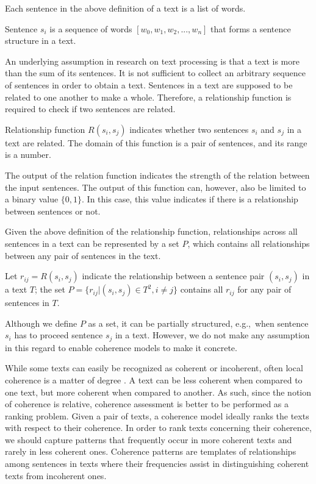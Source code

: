 Each sentence in the above definition of a text is a list of words.

\begin{definition}
Sentence $s_i$ is a sequence of words $[w_0, w_1, w_2, ... , w_n]$ that forms a sentence structure in a text. 
\end{definition}

An underlying assumption in research on text processing is that a text is more than the sum of its sentences. 
It is not sufficient to collect an arbitrary sequence of sentences in order to obtain a text. 
Sentences in a text are supposed to be related to one another to make a whole. 
Therefore, a relationship function is required to check if two sentences are related. 

\begin{definition}
Relationship function $R(s_i,s_j)$ indicates whether two sentences $s_i$ and $s_j$ in a text are related. 
The domain of this function is a pair of sentences, and its range is a number. 
\end{definition} 

The output of the relation function indicates the strength of the relation between the input sentences.  
The output of this function can, however, also be limited to a binary value $\lbrace 0,1\rbrace$. 
In this case, this value indicates if there is a relationship between sentences or not. 

Given the above definition of the relationship function, relationships across all sentences in a text can be represented by a set $P$, which contains all relationships between any pair of sentences in the text. 

\begin{definition}
Let $r_{ij}= R(s_i,s_j)$ indicate the relationship between a sentence pair $(s_i,s_j)$ in a text $T$; the set $P = \lbrace r_{ij}| (s_i,s_j) \in T^2, i \neq j \rbrace$ contains all $r_{ij}$ for any pair of sentences in $T$.
\end{definition}  

Although we define $P$ as a set, it can be partially structured, e.g.,\ when sentence $s_i$ has to proceed sentence $s_j$ in a text. 
However, we do not make any assumption in this regard to enable coherence models to make it concrete. 

While some texts can easily be recognized as coherent or incoherent, often local coherence is a matter of degree \cite{halliday76}. 
A text can be less coherent when compared to one text, but more coherent when compared to another. 
As such, since the notion of coherence is relative, coherence assessment is better to be performed as a ranking problem. 
Given a pair of texts, a coherence model ideally ranks the texts with respect to their coherence.
In order to rank texts concerning their coherence, we should capture patterns that frequently occur in more coherent texts and rarely in less coherent ones.  
Coherence patterns are templates of relationships among sentences in texts where their frequencies assist in distinguishing coherent texts from incoherent ones. 

